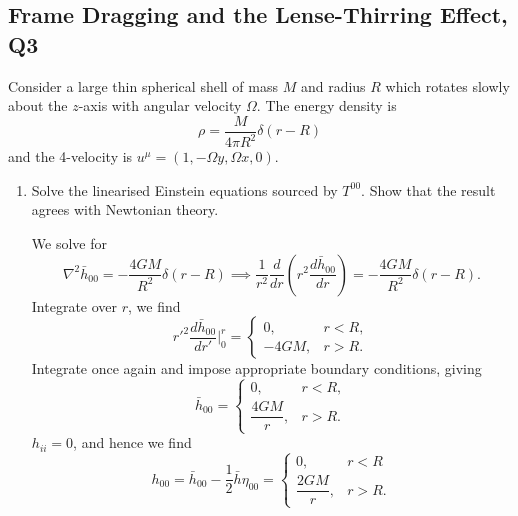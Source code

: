 \subsection{Frame Dragging and the Lense-Thirring Effect, Q3}

Consider a large thin spherical shell of mass $M$ and radius $R$ which rotates slowly about the $z$-axis with angular velocity $\Omega$. The energy density is
\begin{equation}
    \rho = \frac{M}{4\pi R^2}\delta(r-R)
\end{equation}
and the 4-velocity is $u^\mu = (1,-\Omega y, \Omega x, 0)$.

\begin{enumerate}[label=\roman*)]
    \item Solve the linearised Einstein equations sourced by $T^{00}$. Show that the result agrees with Newtonian theory.
    \begin{solution}
        We solve for
        \begin{equation}
            \nabla^2 \bar h_{00} = -\frac{4GM}{R^2}\delta(r-R) \implies \frac{1}{r^2}\frac{d}{dr}\left(r^2\frac{d\bar h_{00}}{dr}\right) = -\frac{4GM}{R^2}\delta (r-R).
        \end{equation}
         Integrate over $r$, we find
         \begin{equation}
             r'^2\frac{d\bar h_{00}}{dr'}\bigg|^r_0 = \begin{cases}
                 0, &r<R,\\
                 -4GM, & r>R.
             \end{cases}
         \end{equation}
        Integrate once again and impose appropriate boundary conditions, giving
        \begin{equation}
            \bar h_{00} = \begin{cases}
                0, & r<R,\\
                \dfrac{4GM}{r}, &r>R.
            \end{cases}
        \end{equation}
        $h_{ii} = 0$, and hence we find 
        \begin{equation}
            h_{00} = \bar h_{00} - \frac{1}{2}\bar h\eta_{00} = \begin{cases}
                0, & r<R\\
                \dfrac{2GM}{r}, & r>R.
            \end{cases}
        \end{equation}
    \end{solution}
    

\end{enumerate}
